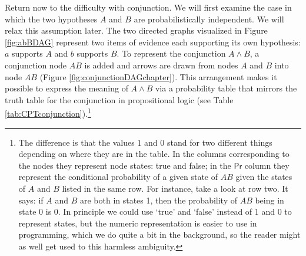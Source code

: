 \documentclass[
  10pt,
  dvipsnames,enabledeprecatedfontcommands]{scrartcl}
\begin{document}
Return now to the difficulty with conjunction. We will first examine the
case in which the two hypotheses \(A\) and \(B\) are probabilistically
independent. We will relax this assumption later. The two directed
graphs visualized in Figure \ref{fig:abBDAG} represent two items of
evidence each supporting its own hypothesis: \(a\) supports \(A\) and
\(b\) supports \(B\). To represent the conjunction \(A\wedge B\), a
conjunction node \(AB\) is added and arrows are drawn from nodes \(A\)
and \(B\) into node \(AB\) (Figure \ref{fig:conjunctionDAGchapter}).
This arrangement makes it possible to express the meaning of
\(A\wedge B\) via a probability table that mirrors the truth table for
the conjunction in propositional logic (see Table
\ref{tab:CPTconjunction}).\footnote{The difference is that the values
  \(1\) and \(0\) stand for two different things depending on where they
  are in the table. In the columns corresponding to the nodes they
  represent node states: true and false; in the \(\textsf{Pr}\) column
  they represent the conditional probability of a given state of \(AB\)
  given the states of \(A\) and \(B\) listed in the same row. For
  instance, take a look at row two. It says: if \(A\) and \(B\) are both
  in states 1, then the probability of \(AB\) being in state 0 is 0. In
  principle we could use `true' and `false' instead of 1 and 0 to
  represent states, but the numeric representation is easier to use in
  programming, which we do quite a bit in the background, so the reader
  might as well get used to this harmless ambiguity.}
\end{document}
